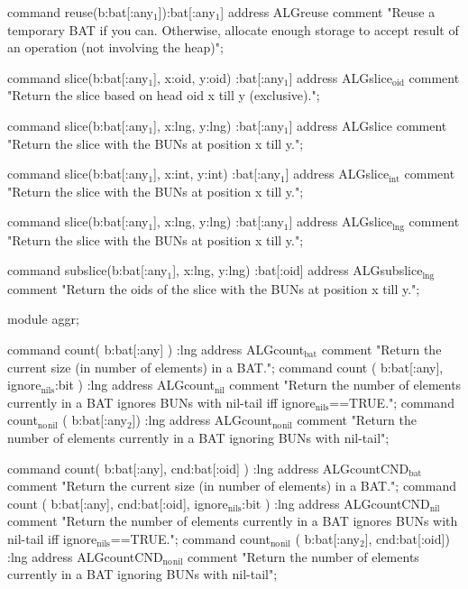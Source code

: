 \documentclass[11pt]{article}
\begin{document}
command reuse(b:bat[:any\(_{\text{1}}\)]):bat[:any\(_{\text{1}}\)]
address ALGreuse
comment "Reuse a temporary BAT if you can. Otherwise,
	allocate enough storage to accept result of an
 	operation (not involving the heap)";

command slice(b:bat[:any\(_{\text{1}}\)], x:oid, y:oid) :bat[:any\(_{\text{1}}\)]
address ALGslice\(_{\text{oid}}\)
comment "Return the slice based on head oid x till y (exclusive).";

command slice(b:bat[:any\(_{\text{1}}\)], x:lng, y:lng) :bat[:any\(_{\text{1}}\)]
address ALGslice
comment "Return the slice with the BUNs at position x till y.";

command slice(b:bat[:any\(_{\text{1}}\)], x:int, y:int) :bat[:any\(_{\text{1}}\)]
address ALGslice\(_{\text{int}}\)
comment "Return the slice with the BUNs at position x till y.";

command slice(b:bat[:any\(_{\text{1}}\)], x:lng, y:lng) :bat[:any\(_{\text{1}}\)]
address ALGslice\(_{\text{lng}}\)
comment "Return the slice with the BUNs at position x till y.";

command subslice(b:bat[:any\(_{\text{1}}\)], x:lng, y:lng) :bat[:oid]
address ALGsubslice\(_{\text{lng}}\)
comment "Return the oids of the slice with the BUNs at position x till y.";

module aggr;

command count( b:bat[:any] ) :lng
address ALGcount\(_{\text{bat}}\)
comment "Return the current size (in number of elements) in a BAT.";
command count ( b:bat[:any], ignore\(_{\text{nils}}\):bit ) :lng
address ALGcount\(_{\text{nil}}\)
comment "Return the number of elements currently in a BAT ignores
		BUNs with nil-tail iff ignore\(_{\text{nils}}\)==TRUE.";
command count\(_{\text{no}}\)\(_{\text{nil}}\) ( b:bat[:any\(_{\text{2}}\)]) :lng
address ALGcount\(_{\text{no}}\)\(_{\text{nil}}\)
comment "Return the number of elements currently
	in a BAT ignoring BUNs with nil-tail";

command count( b:bat[:any], cnd:bat[:oid] ) :lng
address ALGcountCND\(_{\text{bat}}\)
comment "Return the current size (in number of elements) in a BAT.";
command count ( b:bat[:any], cnd:bat[:oid], ignore\(_{\text{nils}}\):bit ) :lng
address ALGcountCND\(_{\text{nil}}\)
comment "Return the number of elements currently in a BAT ignores
		BUNs with nil-tail iff ignore\(_{\text{nils}}\)==TRUE.";
command count\(_{\text{no}}\)\(_{\text{nil}}\) ( b:bat[:any\(_{\text{2}}\)], cnd:bat[:oid]) :lng
address ALGcountCND\(_{\text{no}}\)\(_{\text{nil}}\)
comment "Return the number of elements currently
	in a BAT ignoring BUNs with nil-tail";
\end{document}
